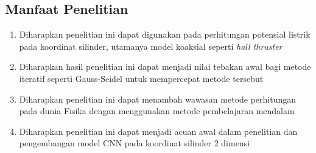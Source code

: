 \subsection{Manfaat Penelitian}
\begin{enumerate}
    \item Diharapkan penelitian ini dapat digunakan pada perhitungan potensial listrik pada koordinat silinder, utamanya model koaksial seperti \emph{hall thruster}
    \item Diharapkan hasil penelitian ini dapat menjadi nilai tebakan awal bagi metode iteratif seperti Gauss-Seidel untuk mempercepat metode tersebut
    \item Diharapkan penelitian ini dapat menambah wawasan metode perhitungan pada dunia Fisika dengan menggunakan metode pembelajaran mendalam
    \item Diharapkan penelitian ini dapat menjadi acuan awal dalam penelitian dan pengembangan model CNN pada koordinat silinder 2 dimensi
\end{enumerate}